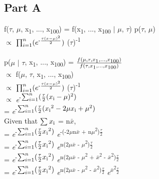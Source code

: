 \documentclass{article}
\begin{document}
\subsection{Part A}
f($\tau$, $\mu$, x\textsubscript{1}, ..., x\textsubscript{100}) = f(x\textsubscript{1}, ..., x\textsubscript{100} $\vert$ $\mu$, $\tau$) p($\tau$, $\mu$)\\
$\propto$ $\prod_{i=1}^{n} (e\textsuperscript{-$\frac{\tau(x-\mu)\textsuperscript{2}}{2}$})$ ($\tau$)\textsuperscript{-1}\\\\
p($\mu$ $\vert$ $\tau$, x\textsubscript{1}, ..., x\textsubscript{100}) = $\frac{f(\mu, \tau, x\textsubscript{1}, ..., x\textsubscript{100})}{f(\tau, x\textsubscript{1}, ..., x\textsubscript{100})}$\\
$\propto$ f($\mu$, $\tau$, x\textsubscript{1}, ..., x\textsubscript{100})\\
$\propto$ $\prod_{i=1}^{n} (e\textsuperscript{-$\frac{\tau(x-\mu)\textsuperscript{2}}{2}$})$ ($\tau$)\textsuperscript{-1}\\
$\propto$ \textit{e}\textsuperscript{-$\sum_{i=1}^{n} (\frac{\tau}{2}(x\textsubscript{i} - \mu)\textsuperscript{2})$}\\
= \textit{e}\textsuperscript{-$\sum_{i=1}^{n} (\frac{\tau}{2}(x\textsubscript{i}\textsuperscript{2} - 2\mu x\textsubscript{i} + \mu\textsuperscript{2})$}\\
Given that $\sum_{}^{}x\textsubscript{i}$ = n$\bar{x}$,\\
= \textit{e}\textsuperscript{-$\sum_{i=1}^{n} (\frac{\tau}{2}x\textsubscript{i}\textsuperscript{2})$} \textit{e}\textsuperscript{-(-2$\mu$n$\bar{x}$ + n$\mu$\textsuperscript{2})$\frac{\tau}{2}$}\\
= \textit{e}\textsuperscript{-$\sum_{i=1}^{n} (\frac{\tau}{2}x\textsubscript{i}\textsuperscript{2})$} \textit{e}\textsuperscript{n(2$\mu$$\bar{x}$ - $\mu$\textsuperscript{2})$\frac{\tau}{2}$}\\
= \textit{e}\textsuperscript{-$\sum_{i=1}^{n} (\frac{\tau}{2}x\textsubscript{i}\textsuperscript{2})$} \textit{e}\textsuperscript{n(2$\mu$$\bar{x}$ - $\mu$\textsuperscript{2} + $\bar{x}$\textsuperscript{2} - $\bar{x}$\textsuperscript{2})$\frac{\tau}{2}$}\\
=  \textit{e}\textsuperscript{-$\sum_{i=1}^{n} (\frac{\tau}{2}x\textsubscript{i}\textsuperscript{2})$} \textit{e}\textsuperscript{n(2$\mu$$\bar{x}$ - $\mu$\textsuperscript{2} - $\bar{x}$\textsuperscript{2})$\frac{\tau}{2}$} \textit{e}\textsuperscript{$\bar{x}$\textsuperscript{2}$\frac{\tau}{2}$}\\
\end{document}
